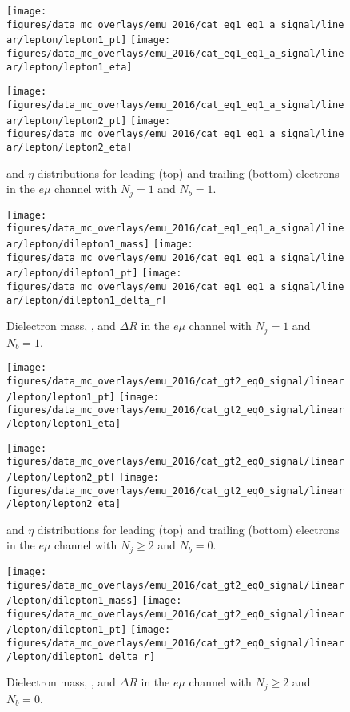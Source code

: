 \begin{figure}[htb!]
    \centering
    \texttt{[image: figures/data\_mc\_overlays/emu\_2016/cat\_eq1\_eq1\_a\_signal/linear/lepton/lepton1\_pt]}
    \texttt{[image: figures/data\_mc\_overlays/emu\_2016/cat\_eq1\_eq1\_a\_signal/linear/lepton/lepton1\_eta]}

    \texttt{[image: figures/data\_mc\_overlays/emu\_2016/cat\_eq1\_eq1\_a\_signal/linear/lepton/lepton2\_pt]}
    \texttt{[image: figures/data\_mc\_overlays/emu\_2016/cat\_eq1\_eq1\_a\_signal/linear/lepton/lepton2\_eta]}
    \caption{\pt and $\eta$ distributions for leading (top) and trailing
        (bottom) electrons in the $e\mu$ channel with $N_{j} = 1$ and
        $N_{b} = 1$.}
    \label{fig:emu_3_kinematic}
\end{figure}

\begin{figure}[htb!]
    \centering
    \texttt{[image: figures/data\_mc\_overlays/emu\_2016/cat\_eq1\_eq1\_a\_signal/linear/lepton/dilepton1\_mass]}
    \texttt{[image: figures/data\_mc\_overlays/emu\_2016/cat\_eq1\_eq1\_a\_signal/linear/lepton/dilepton1\_pt]}
    \texttt{[image: figures/data\_mc\_overlays/emu\_2016/cat\_eq1\_eq1\_a\_signal/linear/lepton/dilepton1\_delta\_r]}
    \caption{Dielectron mass, \pt, and $\Delta R$ in the $e\mu$ channel
    with $N_{j} = 1$ and $N_{b} = 1$.}
    \label{fig:emu_3_dilepton}
\end{figure}

\begin{figure}[htb!]
    \centering
    \texttt{[image: figures/data\_mc\_overlays/emu\_2016/cat\_gt2\_eq0\_signal/linear/lepton/lepton1\_pt]}
    \texttt{[image: figures/data\_mc\_overlays/emu\_2016/cat\_gt2\_eq0\_signal/linear/lepton/lepton1\_eta]}

    \texttt{[image: figures/data\_mc\_overlays/emu\_2016/cat\_gt2\_eq0\_signal/linear/lepton/lepton2\_pt]}
    \texttt{[image: figures/data\_mc\_overlays/emu\_2016/cat\_gt2\_eq0\_signal/linear/lepton/lepton2\_eta]}
    \caption{\pt and $\eta$ distributions for leading (top) and trailing
        (bottom) electrons in the $e\mu$ channel with $N_{j} \geq 2$ and
        $N_{b} = 0$.}
    \label{fig:emu_4_kinematic}
\end{figure}

\begin{figure}[htb!]
    \centering
    \texttt{[image: figures/data\_mc\_overlays/emu\_2016/cat\_gt2\_eq0\_signal/linear/lepton/dilepton1\_mass]}
    \texttt{[image: figures/data\_mc\_overlays/emu\_2016/cat\_gt2\_eq0\_signal/linear/lepton/dilepton1\_pt]}
    \texttt{[image: figures/data\_mc\_overlays/emu\_2016/cat\_gt2\_eq0\_signal/linear/lepton/dilepton1\_delta\_r]}
    \caption{Dielectron mass, \pt, and $\Delta R$ in the $e\mu$ channel
    with $N_{j} \geq 2$ and $N_{b} = 0$.}
    \label{fig:emu_4_dilepton}
\end{figure}

